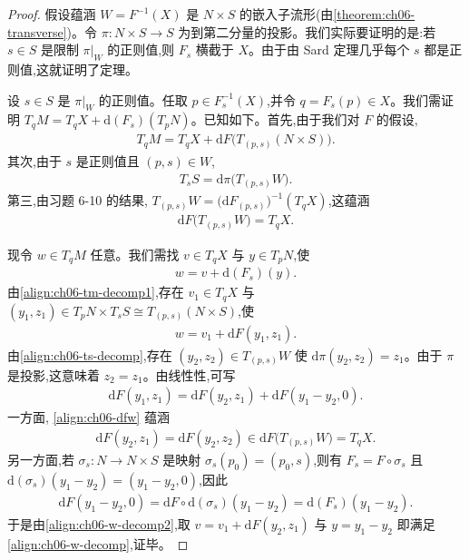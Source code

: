 \documentclass[../../main.tex]{subfiles}
\begin{document}
\begin{proof}
假设蕴涵 $W=F^{-1}(X)$ 是 $N\times S$ 的嵌入子流形(由\cref{theorem:ch06-transverse})。令 $\pi:N\times S\to S$ 为到第二分量的投影。我们实际要证明的是:若 $s\in S$ 是限制 $\pi|_W$ 的正则值,则 $F_s$ 横截于 $X$。由于由 Sard 定理几乎每个 $s$ 都是正则值,这就证明了定理。

设 $s\in S$ 是 $\pi|_W$ 的正则值。任取 $p\in F_s^{-1}(X)$,并令 $q=F_s(p)\in X$。我们需证明 $T_qM=T_qX+\mathrm{d}(F_s)(T_pN)$。已知如下。首先,由于我们对 $F$ 的假设,
\begin{align}\label{align:ch06-tm-decomp1}
T_qM=T_qX+\mathrm{d}F\bigl(T_{(p,s)}(N\times S)\bigr).
\end{align}
其次,由于 $s$ 是正则值且 $(p,s)\in W$,
\begin{align}\label{align:ch06-ts-decomp}
T_sS=\mathrm{d}\pi\bigl(T_{(p,s)}W\bigr).
\end{align}
第三,由习题 6-10 的结果, $T_{(p,s)}W=\bigl(\mathrm{d}F_{(p,s)}\bigr)^{-1}(T_qX)$,这蕴涵
\begin{align}\label{align:ch06-dfw}
\mathrm{d}F\bigl(T_{(p,s)}W\bigr)=T_qX.
\end{align}

现令 $w\in T_qM$ 任意。我们需找 $v\in T_qX$ 与 $y\in T_pN$,使
\begin{align}\label{align:ch06-w-decomp}
w=v+\mathrm{d}(F_s)(y).
\end{align}
由\eqref{align:ch06-tm-decomp1},存在 $v_1\in T_qX$ 与 $(y_1,z_1)\in T_pN\times T_sS\cong T_{(p,s)}(N\times S)$,使
\begin{align}\label{align:ch06-w-decomp2}
w=v_1+\mathrm{d}F(y_1,z_1).
\end{align}
由\eqref{align:ch06-ts-decomp},存在 $(y_2,z_2)\in T_{(p,s)}W$ 使 $\mathrm{d}\pi(y_2,z_2)=z_1$。由于 $\pi$ 是投影,这意味着 $z_2=z_1$。由线性性,可写
\begin{align*}
\mathrm{d}F(y_1,z_1)=\mathrm{d}F(y_2,z_1)+\mathrm{d}F(y_1-y_2,0).
\end{align*}
一方面, \eqref{align:ch06-dfw} 蕴涵
\begin{align*}
\mathrm{d}F(y_2,z_1)=\mathrm{d}F(y_2,z_2)\in\mathrm{d}F\bigl(T_{(p,s)}W\bigr)=T_qX.
\end{align*}
另一方面,若 $\sigma_s:N\to N\times S$ 是映射 $\sigma_s(p_0)=(p_0,s)$,则有 $F_s=F\circ\sigma_s$ 且 $\mathrm{d}(\sigma_s)(y_1-y_2)=(y_1-y_2,0)$,因此
\begin{align*}
\mathrm{d}F(y_1-y_2,0)=\mathrm{d}F\circ\mathrm{d}(\sigma_s)(y_1-y_2)=\mathrm{d}(F_s)(y_1-y_2).
\end{align*}
于是由\eqref{align:ch06-w-decomp2},取 $v=v_1+\mathrm{d}F(y_2,z_1)$ 与 $y=y_1-y_2$ 即满足\eqref{align:ch06-w-decomp},证毕。
\end{proof}
\end{document}
